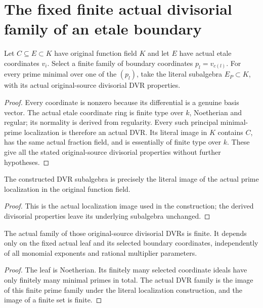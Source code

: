 \section{The fixed finite actual divisorial family of an etale boundary}

\begin{definition}\label{def:sc0-etale-boundary-divisorial-dvr}
\leanok
Let $C\subseteq E\subset K$ have original function field $K$ and let
$E$ have actual etale coordinates $v_i$. Select a finite family of
boundary coordinates $p_l=v_{c(l)}$. For every prime minimal over one
of the $(p_l)$, take the literal subalgebra $E_P\subset K$, with its
actual original-source divisorial DVR properties.
\end{definition}
\begin{proof}
Every coordinate is nonzero because its differential is a genuine
basis vector. The actual etale coordinate ring is finite type over $k$,
Noetherian and regular; its normality is derived from regularity.
Every such principal minimal-prime localization is therefore an actual
DVR. Its literal image in $K$ contains $C$, has the same actual fraction
field, and is essentially of finite type over $k$. These give all the
stated original-source divisorial properties without further hypotheses.
\end{proof}

\begin{lemma}\label{lem:sc0-etale-boundary-divisorial-dvr-value}
\leanok
{}
The constructed DVR subalgebra is precisely the literal image of the
actual prime localization in the original function field.
\end{lemma}
\begin{proof}
This is the actual localization image used in the construction; the
derived divisorial properties leave its underlying subalgebra unchanged.
\end{proof}

\begin{theorem}\label{thm:sc0-finite-etale-boundary-divisorial-dvrs}
\leanok
{}
The actual family of those original-source divisorial DVRs is finite.
It depends only on the fixed actual leaf and its selected boundary
coordinates, independently of all monomial exponents and rational
multiplier parameters.
\end{theorem}
\begin{proof}
The leaf is Noetherian. Its finitely many selected coordinate ideals
have only finitely many minimal primes in total. The actual DVR family
is the image of this finite prime family under the literal localization
construction, and the image of a finite set is finite.
\end{proof}
